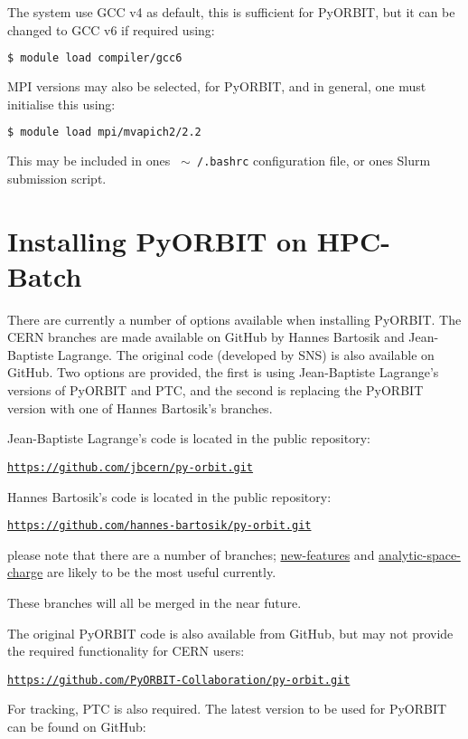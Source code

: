 \documentclass[a4paper]{cernatsnote}
\def \jbgithub {\href{https://github.com/jbcern/py-orbit}{https://github.com/jbcern/py-orbit.git}}
\def \hbgithub {\href{https://github.com/hannes-bartosik/py-orbit}{https://github.com/hannes-bartosik/py-orbit.git}}
\def \pyorbitgithub {\href{https://github.com/PyORBIT-Collaboration/py-orbit}{https://github.com/PyORBIT-Collaboration/py-orbit.git}}
\begin{document}
	The system use GCC v4 as default, this is sufficient for PyORBIT, but it can be changed to GCC v6 if required using:
	\begin{lstlisting}[language=bash]
	$ module load compiler/gcc6
	\end{lstlisting}	
	
	MPI versions may also be selected, for PyORBIT, and in general, one must initialise this using:
	
	\begin{lstlisting}[language=bash]
	$ module load mpi/mvapich2/2.2
	\end{lstlisting}
	
	This may be included in ones \texttt{ $\sim$ /.bashrc} configuration file, or ones Slurm submission script.
	
	\section{Installing PyORBIT on HPC-Batch}
	\label{sec:install}
	
	There are currently a number of options available when installing PyORBIT. The CERN branches are made available on GitHub by Hannes Bartosik and Jean-Baptiste Lagrange. The original code (developed by SNS) is also available on GitHub. Two options are provided, the first is using Jean-Baptiste Lagrange's versions of PyORBIT and PTC, and the second is replacing the PyORBIT version with one of Hannes Bartosik's branches.
	
	Jean-Baptiste Lagrange's code is located in the public repository:
	
	\texttt{\jbgithub}
	
	Hannes Bartosik's code is located in the public repository:
	
	\texttt{\hbgithub}
	
	please note that there are a number of branches; \href{https://github.com/hannes-bartosik/py-orbit/tree/new-features}{new-features} and \href{https://github.com/hannes-bartosik/py-orbit/tree/analytical-space-charge}{analytic-space-charge} are likely to be the most useful currently.
	
	These branches will all be merged in the near future.
	
	The original PyORBIT code is also available from GitHub, but may not provide the required functionality for CERN users:
	
	\texttt{\pyorbitgithub}
	
	For tracking, PTC is also required. The latest version to be used for PyORBIT can be found on GitHub:
	
\end{document}
